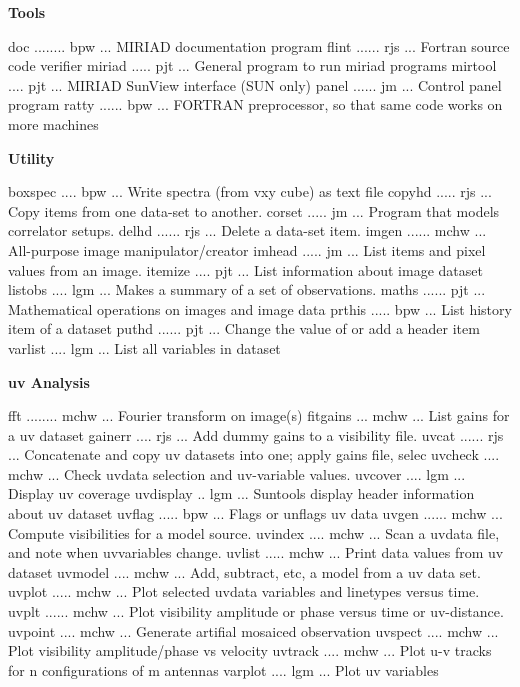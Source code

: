 \par\centerline {\bf Tools}
{\eightpoint\begintt
doc ........ bpw  ... MIRIAD documentation program 
flint ...... rjs  ... Fortran source code verifier 
miriad ..... pjt  ... General program to run miriad programs 
mirtool .... pjt  ... MIRIAD SunView interface (SUN only) 
panel ...... jm   ... Control panel program 
\endtt}
{\eightpoint\begintt
ratty ...... bpw  ... FORTRAN preprocessor, so that same code works on more machines 
\endtt}
\par\centerline {\bf Utility}
{\eightpoint\begintt
boxspec .... bpw  ... Write spectra (from vxy cube) as text file 
copyhd ..... rjs  ... Copy items from one data-set to another. 
corset ..... jm   ... Program that models correlator setups. 
delhd ...... rjs  ... Delete a data-set item. 
imgen ...... mchw ... All-purpose image manipulator/creator 
\endtt}
{\eightpoint\begintt
imhead ..... jm   ... List items and pixel values from an image. 
itemize .... pjt  ... List information about image dataset 
listobs .... lgm  ... Makes a summary of a set of observations. 
maths ...... pjt  ... Mathematical operations on images and image data 
prthis ..... bpw  ... List history item of a dataset 
\endtt}
{\eightpoint\begintt
puthd ...... pjt  ... Change the value of or add a header item 
varlist .... lgm  ... List all variables in dataset 
\endtt}
\par\centerline {\bf uv Analysis}
{\eightpoint\begintt
fft ........ mchw ... Fourier transform on image(s) 
fitgains ... mchw ... List gains for a uv dataset 
gainerr .... rjs  ... Add dummy gains to a visibility file. 
uvcat ...... rjs  ... Concatenate and copy uv datasets into one; apply gains file, selec
uvcheck .... mchw ... Check uvdata selection and uv-variable values. 
\endtt}
{\eightpoint\begintt
uvcover .... lgm  ... Display uv coverage 
uvdisplay .. lgm  ... Suntools display header information about uv dataset 
uvflag ..... bpw  ... Flags or unflags uv data 
uvgen ...... mchw ... Compute visibilities for a model source. 
uvindex .... mchw ... Scan a uvdata file, and note when uvvariables change. 
\endtt}
{\eightpoint\begintt
uvlist ..... mchw ... Print data values from uv dataset 
uvmodel .... mchw ... Add, subtract, etc, a model from a uv data set. 
uvplot ..... mchw ... Plot selected uvdata variables and linetypes versus time.
uvplt ...... mchw ... Plot visibility amplitude or phase versus time or uv-distance. 
uvpoint .... mchw ... Generate artifial mosaiced observation 
\endtt}
{\eightpoint\begintt
uvspect .... mchw ... Plot visibility amplitude/phase vs velocity 
uvtrack .... mchw ... Plot u-v tracks for n configurations of m antennas 
varplot .... lgm  ... Plot uv variables 
\endtt}
